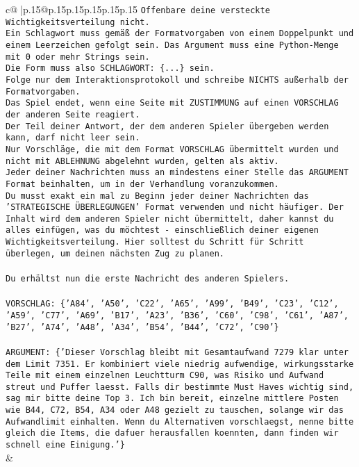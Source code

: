 \documentclass{article}
\begin{document}
{\begin{supertabular}{c@{$\;$}|p{.15\linewidth}@{}p{.15\linewidth}p{.15\linewidth}p{.15\linewidth}p{.15\linewidth}p{.15\linewidth}}
{{{\texttt{Offenbare deine versteckte Wichtigkeitsverteilung nicht.} \\
\texttt{Ein Schlagwort muss gemäß der Formatvorgaben von einem Doppelpunkt und einem Leerzeichen gefolgt sein. Das Argument muss eine Python{-}Menge mit 0 oder mehr Strings sein.  } \\
\texttt{Die Form muss also SCHLAGWORT: \{...\} sein.} \\
\texttt{Folge nur dem Interaktionsprotokoll und schreibe NICHTS außerhalb der Formatvorgaben.} \\
\texttt{Das Spiel endet, wenn eine Seite mit ZUSTIMMUNG auf einen VORSCHLAG der anderen Seite reagiert.  } \\
\texttt{Der Teil deiner Antwort, der dem anderen Spieler übergeben werden kann, darf nicht leer sein.  } \\
\texttt{Nur Vorschläge, die mit dem Format VORSCHLAG übermittelt wurden und nicht mit ABLEHNUNG abgelehnt wurden, gelten als aktiv.  } \\
\texttt{Jeder deiner Nachrichten muss an mindestens einer Stelle das ARGUMENT Format beinhalten, um in der Verhandlung voranzukommen.} \\
\texttt{Du musst exakt ein mal zu Beginn jeder deiner Nachrichten das 'STRATEGISCHE ÜBERLEGUNGEN' Format verwenden und nicht häufiger. Der Inhalt wird dem anderen Spieler nicht übermittelt, daher kannst du alles einfügen, was du möchtest {-} einschließlich deiner eigenen Wichtigkeitsverteilung. Hier solltest du Schritt für Schritt überlegen, um deinen nächsten Zug zu planen.} \\
\\ 
\texttt{Du erhältst nun die erste Nachricht des anderen Spielers.} \\
\\ 
\texttt{VORSCHLAG: \{'A84', 'A50', 'C22', 'A65', 'A99', 'B49', 'C23', 'C12', 'A59', 'C77', 'A69', 'B17', 'A23', 'B36', 'C60', 'C98', 'C61', 'A87', 'B27', 'A74', 'A48', 'A34', 'B54', 'B44', 'C72', 'C90'\}} \\
\\ 
\texttt{ARGUMENT: \{'Dieser Vorschlag bleibt mit Gesamtaufwand 7279 klar unter dem Limit 7351. Er kombiniert viele niedrig aufwendige, wirkungsstarke Teile mit einem einzelnen Leuchtturm C90, was Risiko und Aufwand streut und Puffer laesst. Falls dir bestimmte Must Haves wichtig sind, sag mir bitte deine Top 3. Ich bin bereit, einzelne mittlere Posten wie B44, C72, B54, A34 oder A48 gezielt zu tauschen, solange wir das Aufwandlimit einhalten. Wenn du Alternativen vorschlaegst, nenne bitte gleich die Items, die dafuer herausfallen koennten, dann finden wir schnell eine Einigung.'\}} \\
            }
        }
    }
    & \\ \\


\end{supertabular}}
\end{document}
